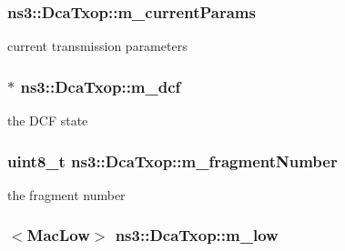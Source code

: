 \subsubsection[{\texorpdfstring{m\+\_\+current\+Params}{m_currentParams}}]{ ns3\+::\+Dca\+Txop\+::m\+\_\+current\+Params\hspace{0.3cm}{\ttfamily [protected]}}\hypertarget{classns3_1_1DcaTxop_a4b7bf5601dc39d1f1828856276893ced}{}\label{classns3_1_1DcaTxop_a4b7bf5601dc39d1f1828856276893ced}


current transmission parameters 

\subsubsection[{\texorpdfstring{m\+\_\+dcf}{m_dcf}}]{$\ast$ ns3\+::\+Dca\+Txop\+::m\+\_\+dcf\hspace{0.3cm}{\ttfamily [protected]}}\hypertarget{classns3_1_1DcaTxop_a16cc1f168ff78aabcf938e42996121c4}{}\label{classns3_1_1DcaTxop_a16cc1f168ff78aabcf938e42996121c4}


the D\+CF state 

\subsubsection[{\texorpdfstring{m\+\_\+fragment\+Number}{m_fragmentNumber}}]{\setlength{\rightskip}{0pt plus 5cm}uint8\+\_\+t ns3\+::\+Dca\+Txop\+::m\+\_\+fragment\+Number\hspace{0.3cm}{\ttfamily [protected]}}\hypertarget{classns3_1_1DcaTxop_a2ce18e9e092b3e606bb4feb7e5dd39fc}{}\label{classns3_1_1DcaTxop_a2ce18e9e092b3e606bb4feb7e5dd39fc}


the fragment number 

\subsubsection[{\texorpdfstring{m\+\_\+low}{m_low}}]{$<${\bf Mac\+Low}$>$ ns3\+::\+Dca\+Txop\+::m\+\_\+low\hspace{0.3cm}{\ttfamily [protected]}}\hypertarget{classns3_1_1DcaTxop_a76de11e512290acc37c9863f7ab17758}{}\label{classns3_1_1DcaTxop_a76de11e512290acc37c9863f7ab17758}


